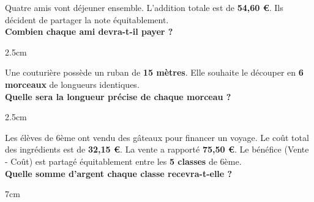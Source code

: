 \documentclass[a4paper]{book}
\begin{document}
    \begin{exemple}
        Quatre amis vont déjeuner ensemble. L'addition totale est de \textbf{54,60 €}. Ils décident de partager la note équitablement. \\
        \textbf{Combien chaque ami devra-t-il payer ?}

        \begin{ZoneReponse}{2.5cm}\end{ZoneReponse}
    \end{exemple}
    
    
    \begin{exemple}
        Une couturière possède un ruban de \textbf{15 mètres}. Elle souhaite le découper en \textbf{6 morceaux} de longueurs identiques. \\
        \textbf{Quelle sera la longueur précise de chaque morceau ?}

        \begin{ZoneReponse}{2.5cm}\end{ZoneReponse}
    \end{exemple}


    \begin{exemple}
        Les élèves de 6ème ont vendu des gâteaux pour financer un voyage. 
        Le coût total des ingrédients est de \textbf{32,15 €}. 
        La vente a rapporté \textbf{75,50 €}. 
        Le bénéfice (Vente - Coût) est partagé équitablement entre les \textbf{5 classes} de 6ème. \\
        \textbf{Quelle somme d'argent chaque classe recevra-t-elle ?}

        \begin{ZoneReponse}{7cm}\end{ZoneReponse}
    \end{exemple}
\end{document}
